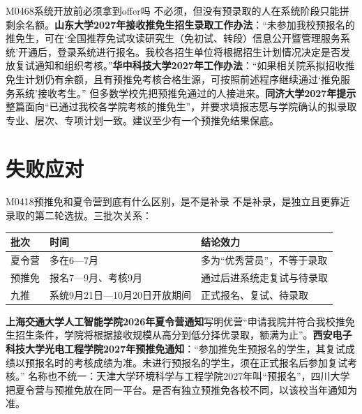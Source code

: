 \begin{qa}{M0468}{系统开放前必须拿到offer吗}
不必须，但没有预录取的人在系统阶段只能拼剩余名额。\textbf{山东大学2027年接收推免生招生录取工作办法}：“未参加我校预报名的推免生，可在‘全国推荐免试攻读研究生（免初试、转段）信息公开暨管理服务系统’开通后，登录系统进行报名。我校各招生单位将根据招生计划情况决定是否发放复试通知和组织考核。”\textbf{华中科技大学2027年工作办法}：“如果相关院系拟招收推免生计划仍有余额，且有预推免考核合格生源，可按照前述程序继续通过‘推免服务系统’接收考生。”
但多数学校先把预推免通过的人接进来。\textbf{同济大学2027年提示}整篇面向“已通过我校各学院考核的推免生”，并要求填报志愿与学院确认的拟录取专业、层次、专项计划一致。建议至少有一个预推免结果保底。
\end{qa}

\section{失败应对}
\begin{qa}{M0418}{预推免和夏令营到底有什么区别，是不是补录}
不是补录，是独立且更靠近录取的第二轮选拔。三批次关系：
\par\vspace{2pt}\nobreak\begin{center}\footnotesize
\begin{tabularx}{\textwidth}{>{\raggedright\arraybackslash}X>{\raggedright\arraybackslash}X>{\raggedright\arraybackslash}X}
\toprule
\textbf{批次} & \textbf{时间} & \textbf{结论效力} \\ \midrule
夏令营 & 多在6—7月 & 多为“优秀营员”，不等于录取 \\
预推免 & 报名7—9月、考核9月 & 通过后进系统走复试与待录取 \\
九推 & 系统9月21日—10月20日开放期间 & 正式报名、复试、待录取 \\
\bottomrule
\end{tabularx}
\end{center}\vspace{2pt}\par
\textbf{上海交通大学人工智能学院2026年夏令营通知}写明优营“申请我院并符合我校推免生招生条件，学院将根据接收规模从高分到低分择优录取，额满为止”。\textbf{西安电子科技大学光电工程学院2027年预推免通知}：“参加推免生预报名的学生，其复试成绩以预报名时的考核成绩为准。未进行预报名的学生，须在正式报名后参加复试考核。”
名称也不统一：天津大学环境科学与工程学院2027年叫“预报名”，四川大学把夏令营与预推免放在同一平台。是否有独立预推免各校不同，以该校当年通知为准。
\end{qa}

